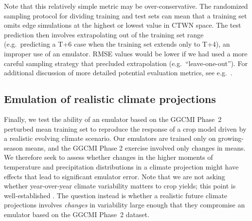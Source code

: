 \documentclass[gmdd]{copernicus} %
\begin{document}
Note that this relatively simple metric may be over-conservative.
The randomized sampling protocol for dividing training and test sets can mean that a training set omits edge simulations at the highest or lowest value in CTWN space. 
The test prediction then involves extrapolating out of the training set range (e.g.\ predicting a T+6 case when the training set extends only to T+4), an improper use of an emulator. 
RMSE values would be lower if we had used a more careful sampling strategy that precluded extrapolation (e.g.\ ``leave-one-out''). 
For additional discussion of more detailed potential evaluation metrics, see e.g.\ \citet{Castruccio14}.

\smallskip
\label{S:4.3}
\subsection{Emulation of realistic climate projections}
Finally, we test the ability of an emulator based on the GGCMI Phase~2 perturbed mean training set to reproduce the response of a crop model driven by a realistic evolving climate scenario. 
Our emulators are trained only on growing-season means, and the GGCMI Phase 2 exercise involved only changes in means. We therefore seek to assess whether changes in the higher moments of temperature and precipitation distributions in a climate projection might have effects that lead to significant emulator error. Note that we are not asking whether year-over-year climate variability matters to crop yields; this point is well-established \citep{ray_climate_2015}. The question instead is whether a realistic future climate projections involves \textit{changes} in variability large enough that they compromise an emulator based on the GGCMI Phase~2 dataset. 
 
\end{document}
